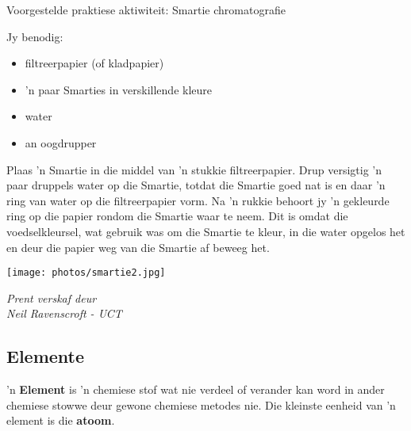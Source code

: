 \begin{activity}{Voorgestelde praktiese aktiwiteit: Smartie chromatografie}{
Jy benodig:
\begin{itemize}[noitemsep]
\item filtreerpapier (of kladpapier)
\item 'n paar Smarties in verskillende kleure
\item water
\item an oogdrupper
\end{itemize}
\begin{minipage}{.5\textwidth}
Plaas 'n Smartie in die middel van 'n stukkie filtreerpapier. Drup versigtig 'n paar druppels water op die Smartie, totdat die Smartie goed nat is en daar 'n ring van water op die filtreerpapier vorm. Na 'n rukkie behoort jy 'n gekleurde ring op die papier rondom die Smartie waar te neem. Dit is omdat die voedselkleursel, wat gebruik was om die Smartie te kleur, in die water opgelos het en deur die papier weg van die Smartie af beweeg het.
\end{minipage}
\begin{minipage}{.5\textwidth}
\begin{center}
 \texttt{[image: photos/smartie2.jpg]}\par
\textit{Prent verskaf deur\\ Neil Ravenscroft - UCT}
\end{center}
\end{minipage}
}
\end{activity}
\par 
	\par
      \label{m38708*uid25}
            \subsection*{Elemente}
            \nopagebreak
        \label{m38708*id63302} 'n \textbf{Element} is 'n chemiese stof wat nie verdeel of verander kan word in ander chemiese stowwe deur gewone chemiese metodes nie. Die kleinste eenheid van 'n element is die \textbf{atoom}.\par 



